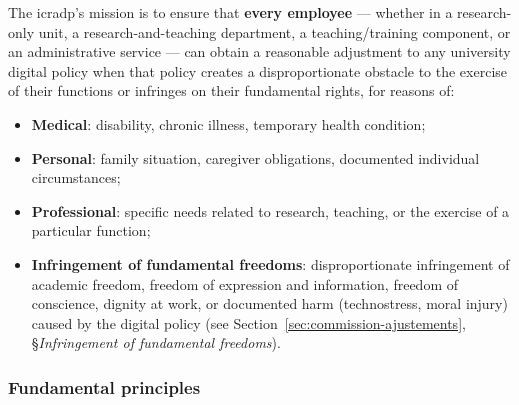 The \gls{icradp}'s mission is to ensure that \textbf{every employee}
--- whether in a research-only unit, a research-and-teaching department,
a teaching/training component, or an administrative service ---
can obtain a reasonable adjustment to any university digital policy
when that policy creates a disproportionate obstacle
to the exercise of their functions or infringes on
their fundamental rights, for reasons of:
\begin{itemize}[nosep]
    \item \textbf{Medical}: disability, chronic illness, temporary
    health condition;
    \item \textbf{Personal}: family situation, caregiver
    obligations, documented individual circumstances;
    \item \textbf{Professional}: specific needs related to
    research, teaching, or the exercise of a particular
    function;
    \item \textbf{Infringement of fundamental freedoms}: disproportionate
    infringement of academic freedom, freedom of expression
    and information, freedom of conscience, dignity at
    work, or documented harm (technostress, moral injury)
    caused by the digital policy
    (see Section~\ref{sec:commission-ajustements},
    \S\emph{Infringement of fundamental freedoms}).
\end{itemize}

\subsubsection{Fundamental principles}

